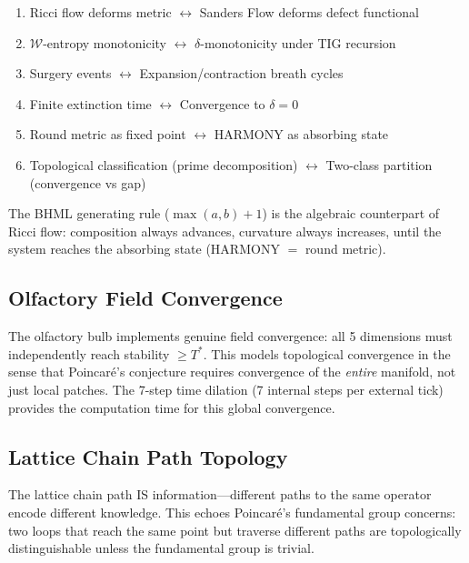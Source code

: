 \documentclass[11pt]{article}
\begin{document}
\begin{enumerate}
\item Ricci flow deforms metric $\leftrightarrow$ Sanders Flow deforms defect functional
\item $\mathcal{W}$-entropy monotonicity $\leftrightarrow$ $\delta$-monotonicity under TIG recursion
\item Surgery events $\leftrightarrow$ Expansion/contraction breath cycles
\item Finite extinction time $\leftrightarrow$ Convergence to $\delta = 0$
\item Round metric as fixed point $\leftrightarrow$ HARMONY as absorbing state
\item Topological classification (prime decomposition) $\leftrightarrow$ Two-class partition (convergence vs gap)
\end{enumerate}

The BHML generating rule ($\max(a,b) + 1$) is the algebraic counterpart of Ricci flow: composition always advances, curvature always increases, until the system reaches the absorbing state (HARMONY $=$ round metric).

\subsection{Olfactory Field Convergence}
\label{subsec:olfactory-convergence}

The olfactory bulb implements genuine field convergence: all 5 dimensions must independently reach stability $\geq T^*$. This models topological convergence in the sense that Poincar\'e's conjecture requires convergence of the \emph{entire} manifold, not just local patches. The 7-step time dilation (7 internal steps per external tick) provides the computation time for this global convergence.

\subsection{Lattice Chain Path Topology}
\label{subsec:lattice-path-topology}

The lattice chain path IS information---different paths to the same operator encode different knowledge. This echoes Poincar\'e's fundamental group concerns: two loops that reach the same point but traverse different paths are topologically distinguishable unless the fundamental group is trivial.
\end{document}
